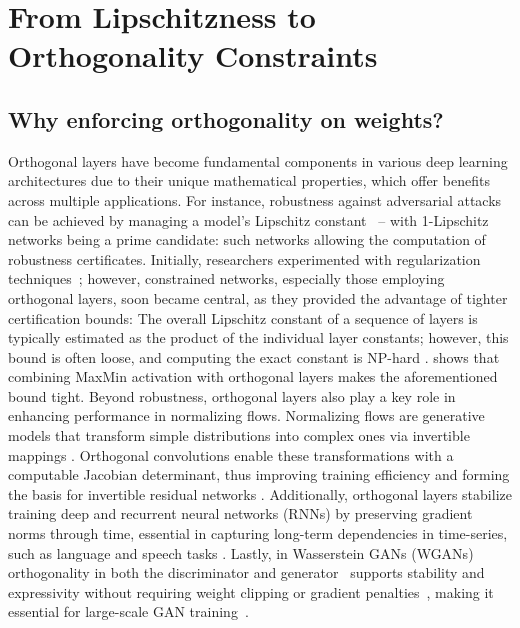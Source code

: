 \chapter{From Lipschitzness to Orthogonality Constraints}
\label{ch:background}

\section{Why enforcing orthogonality on weights?}

    Orthogonal layers have become fundamental components in various deep learning architectures due to their unique mathematical properties, which offer benefits across multiple applications. 
    For instance, robustness against adversarial attacks can be achieved by managing a model's Lipschitz constant~\cite{szegedy_intriguing_2013} -- with 1-Lipschitz networks being a prime candidate: such networks allowing the computation of robustness certificates. 
    Initially, researchers experimented with regularization techniques~\cite{cisse2017parseval}; however, constrained networks, especially those employing orthogonal layers, soon became central, as they provided the advantage of tighter certification bounds: The overall Lipschitz constant of a sequence of layers is typically estimated as the product of the individual layer constants; however, this bound is often loose, and computing the exact constant is NP-hard \cite{virmaux2018lipschitz}. \cite{anil_sorting_2019} 
    shows that combining MaxMin activation with orthogonal layers makes the aforementioned bound tight.
    Beyond robustness, orthogonal layers also play a key role in enhancing performance in normalizing flows. Normalizing flows are generative models that transform simple distributions into complex ones via invertible mappings \cite{dinh2016density, rezende2015variational}.  Orthogonal convolutions enable these transformations with a computable Jacobian determinant, thus improving training efficiency \cite{kingma2018glow} and forming the basis for invertible residual networks \cite{behrmann2019invertible}.
    Additionally, orthogonal layers stabilize training deep and recurrent neural networks (RNNs) by preserving gradient norms through time, essential in capturing long-term dependencies in time-series, such as language and speech tasks \cite{kiani_projunn_2022,qi_deep_isometric_2020, bansal2018gainorthogonalityregularizationstraining}. Lastly, in Wasserstein GANs (WGANs) \cite{arjovsky2017wasserstein} orthogonality in both the discriminator and generator~\cite{muller2019orthogonal} supports stability and expressivity without requiring weight clipping or gradient penalties~\cite{gulrajani2017improved}, making it essential for large-scale GAN training~\cite{brock2018large, miyato2018spectral}.



